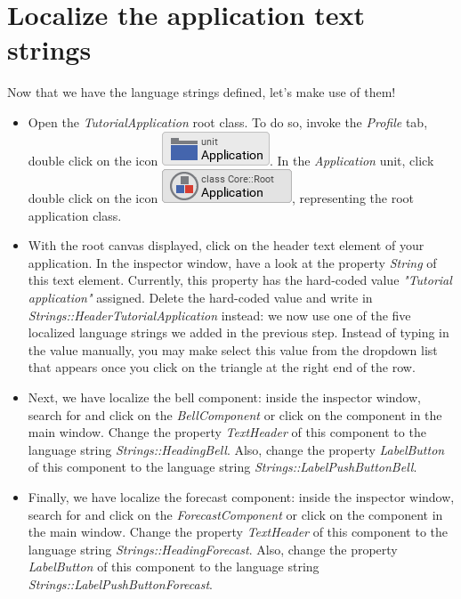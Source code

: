 \documentclass[
  a4paper,
,tablecaptionabove
]{scrbook}
\begin{document}
\hypertarget{_localize_the_application_text_strings}{%
\section{Localize the application text
strings}\label{_localize_the_application_text_strings}}

Now that we have the language strings defined, let's make use of them!

\begin{itemize}
\item
  Open the \emph{TutorialApplication} root class. To do so, invoke the
  \emph{Profile} tab, double click on the icon
  \includegraphics{./../asciidoc/modules/ROOT/assets/images/icons/ApplicationUnitIcon.png}.
  In the \emph{Application} unit, click double click on the icon
  \includegraphics{./../asciidoc/modules/ROOT/assets/images/icons/ApplicationClassIcon.png},
  representing the root application class.
\item
  With the root canvas displayed, click on the header text element of
  your application. In the inspector window, have a look at the property
  \emph{String} of this text element. Currently, this property has the
  hard-coded value \emph{"Tutorial application"} assigned. Delete the
  hard-coded value and write in
  \emph{Strings::HeaderTutorialApplication} instead: we now use one of
  the five localized language strings we added in the previous step.
  Instead of typing in the value manually, you may make select this
  value from the dropdown list that appears once you click on the
  triangle at the right end of the row.
\item
  Next, we have localize the bell component: inside the inspector
  window, search for and click on the \emph{BellComponent} or click on
  the component in the main window. Change the property
  \emph{TextHeader} of this component to the language string
  \emph{Strings::HeadingBell}. Also, change the property
  \emph{LabelButton} of this component to the language string
  \emph{Strings::LabelPushButtonBell}.
\item
  Finally, we have localize the forecast component: inside the inspector
  window, search for and click on the \emph{ForecastComponent} or click
  on the component in the main window. Change the property
  \emph{TextHeader} of this component to the language string
  \emph{Strings::HeadingForecast}. Also, change the property
  \emph{LabelButton} of this component to the language string
  \emph{Strings::LabelPushButtonForecast}.
\end{itemize}
\end{document}
